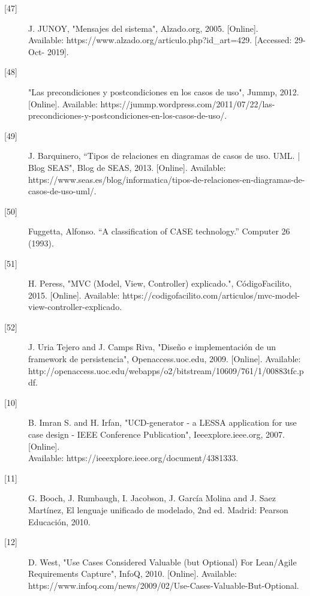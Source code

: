 \begin{description}
		\item[\hypertarget{b47}{[47]}]J. JUNOY, "Mensajes del sistema", Alzado.org, 2005. [Online]. \\ Available: https://www.alzado.org/articulo.php?id\_art=429. [Accessed: 29- Oct- 2019].
		
		\item[\hypertarget{b48}{[48]}]"Las precondiciones y postcondiciones en los casos de uso", Jummp, 2012. [Online]. Available: https://jummp.wordpress.com/2011/07/22/las-precondiciones-y-postcondiciones-en-los-casos-de-uso/.
		
		\item[\hypertarget{b49}{[49]}]J. Barquinero, “Tipos de relaciones en diagramas de casos de uso. UML. | Blog SEAS", Blog de SEAS, 2013. [Online]. Available: https://www.seas.es/blog/informatica/tipos-de-relaciones-en-diagramas-de-casos-de-uso-uml/. 
		
		\item[\hypertarget{b50}{[50]}] Fuggetta, Alfonso. “A classification of CASE technology.” Computer 26 (1993).
		
		\item[\hypertarget{b51}{[51]}] H. Peress, "MVC (Model, View, Controller) explicado.", CódigoFacilito, 2015. [Online]. Available: https://codigofacilito.com/articulos/mvc-model-view-controller-explicado. \\
		
		\item[\hypertarget{b52}{[52]}] J. Uria Tejero and J. Camps Riva, "Diseño e implementación de un framework de persistencia", Openaccess.uoc.edu, 2009. [Online]. Available: http://openaccess.uoc.edu/webapps/o2/bitstream/10609/761/1/00883tfc.pdf.
		
		\item[\hypertarget{b10}{[10]}] B. Imran S. and H. Irfan, "UCD-generator - a LESSA application for use case design - IEEE Conference Publication", Ieeexplore.ieee.org, 2007. [Online]. \\Available: https://ieeexplore.ieee.org/document/4381333.
		
		\item[\hypertarget{b11}{[11]}] G. Booch, J. Rumbaugh, I. Jacobson, J. García Molina and J. Saez Martínez, El lenguaje unificado de modelado, 2nd ed. Madrid: Pearson Educación, 2010.
		
		\item[\hypertarget{b12}{[12]}] D. West, "Use Cases Considered Valuable (but Optional) For Lean/Agile Requirements Capture", InfoQ, 2010. [Online]. Available: https://www.infoq.com/news/2009/02/Use-Cases-Valuable-But-Optional. 
		

\end{description}
